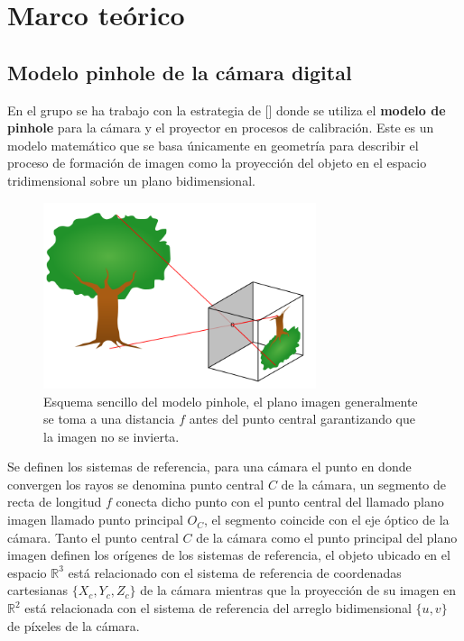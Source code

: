 \documentclass[UTF8]{article}
\begin{document}





\section{Marco teórico}


\subsection{Modelo pinhole de la cámara digital}


En el grupo se ha trabajo con la estrategia de [] donde se utiliza el \textbf{modelo de pinhole} para la cámara y el proyector en procesos de calibración. Este es un modelo matemático que se basa únicamente en geometría para describir el proceso de formación de imagen como la proyección del objeto en el espacio tridimensional sobre un plano bidimensional.

\begin{figure}[h!]
\includegraphics[width=8cm]{camera.png}
\centering
\caption{Esquema sencillo del modelo pinhole, el plano imagen generalmente se toma a una distancia $f$ antes del punto central garantizando que la imagen no se invierta.}
\label{im2}
\end{figure}
\medskip

Se definen los sistemas de referencia, para una cámara el punto en donde convergen los rayos se denomina punto central $C$ de la cámara, un segmento de recta de longitud $f$ conecta dicho punto con el punto central del llamado plano imagen llamado punto principal $O_{C}$, el segmento coincide con el eje óptico de la cámara.
%
Tanto el punto central $C$ de la cámara como el punto principal  del plano imagen definen los orígenes de los sistemas de referencia, el objeto ubicado en el espacio $\mathbb{R}^3$ está relacionado con el sistema de referencia de coordenadas cartesianas $\{X_{c},Y_{c},Z_{c}\}$ de la cámara mientras que la proyección de su imagen en $\mathbb{R}^2$ está relacionada con el sistema de referencia del arreglo bidimensional $\{u,v\}$ de píxeles de la cámara.
\medskip
\end{document}
